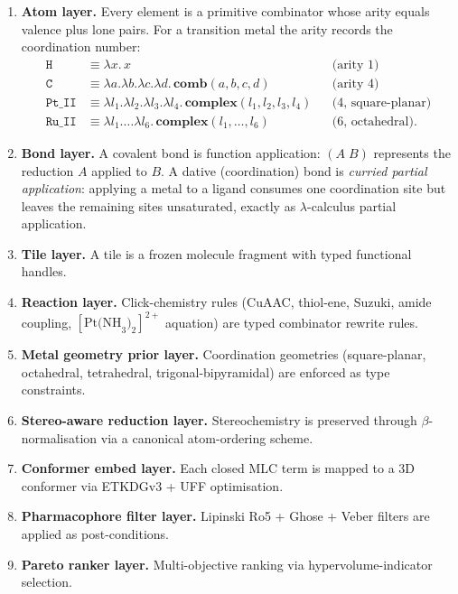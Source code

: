 \begin{enumerate}
  \item \textbf{Atom layer.}  Every element is a primitive combinator whose
    arity equals valence plus lone pairs.  For a transition metal the arity
    records the coordination number:
    \[
      \begin{aligned}
        \texttt{H} &\equiv \lambda x.\,x                      &&\text{(arity 1)}\\
        \texttt{C} &\equiv \lambda a.\lambda b.\lambda c.\lambda d.\,\mathbf{comb}(a,b,c,d)
                                                                    &&\text{(arity 4)}\\
        \texttt{Pt\_II} &\equiv \lambda l_1.\lambda l_2.\lambda l_3.\lambda l_4.\,
                               \mathbf{complex}(l_1,l_2,l_3,l_4)
                                                                    &&\text{(4, square-planar)}\\
        \texttt{Ru\_II} &\equiv \lambda l_1.\dots\lambda l_6.\,
                               \mathbf{complex}(l_1,\dots,l_6)
                                                                    &&\text{(6, octahedral)} .
      \end{aligned}
    \]
  \item \textbf{Bond layer.}  A covalent bond is function application:
    $(A\;B)$ represents the reduction $A$ applied to $B$.  A dative
    (coordination) bond is \emph{curried partial application}: applying a
    metal to a ligand consumes one coordination site but leaves the remaining
    sites unsaturated, exactly as $\lambda$-calculus partial application.
  \item \textbf{Tile layer.}  A tile is a frozen molecule fragment with typed
    functional handles.
  \item \textbf{Reaction layer.}  Click-chemistry rules (CuAAC, thiol-ene,
    Suzuki, amide coupling, $[\text{Pt(NH}_3\text{)}_2]^{2+}$ aquation) are
    typed combinator rewrite rules.
  \item \textbf{Metal geometry prior layer.}  Coordination geometries
    (square-planar, octahedral, tetrahedral, trigonal-bipyramidal) are
    enforced as type constraints.
  \item \textbf{Stereo-aware reduction layer.}  Stereochemistry is preserved
    through $\beta$-normalisation via a canonical atom-ordering scheme.
  \item \textbf{Conformer embed layer.}  Each closed MLC term is mapped to a
    3D conformer via ETKDGv3 + UFF optimisation.
  \item \textbf{Pharmacophore filter layer.}  Lipinski Ro5 + Ghose + Veber
    filters are applied as post-conditions.
  \item \textbf{Pareto ranker layer.}  Multi-objective ranking via
    hypervolume-indicator selection.
\end{enumerate}

